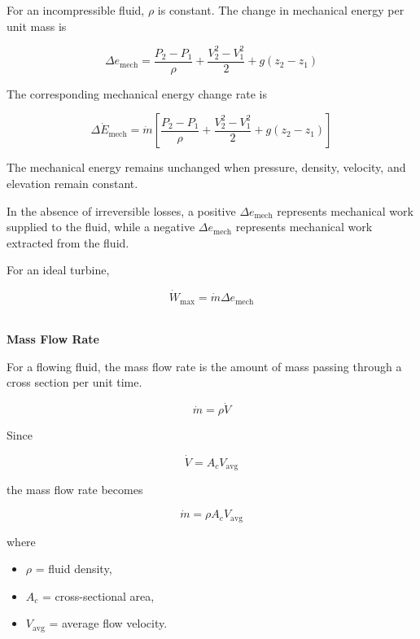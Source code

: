 \documentclass[12pt]{article}
\begin{document}
For an incompressible fluid, $\rho$ is constant. The change in mechanical energy per unit mass is

\begin{equation*}
\Delta e_{\text{mech}}
=
\frac{P_2-P_1}{\rho}
+
\frac{V_2^2-V_1^2}{2}
+
g(z_2-z_1)
\end{equation*}

The corresponding mechanical energy change rate is

\begin{equation*}
\Delta \dot{E}_{\text{mech}}
=
\dot{m}
\left[
\frac{P_2-P_1}{\rho}
+
\frac{V_2^2-V_1^2}{2}
+
g(z_2-z_1)
\right]
\end{equation*}

The mechanical energy remains unchanged when pressure, density, velocity, and elevation remain constant.

In the absence of irreversible losses, a positive $\Delta e_{\text{mech}}$ represents mechanical work supplied to the fluid, while a negative $\Delta e_{\text{mech}}$ represents mechanical work extracted from the fluid.

For an ideal turbine,

\begin{equation*}
\dot{W}_{\max}
=
\dot{m}\Delta e_{\text{mech}}
\end{equation*}

\textbf{\\ Mass Flow Rate}

For a flowing fluid, the mass flow rate is the amount of mass passing through a cross section per unit time.

\begin{equation*}
\dot{m}
=
\rho\dot{V}
\end{equation*}

Since

\begin{equation*}
\dot{V}
=
A_cV_{\text{avg}}
\end{equation*}

the mass flow rate becomes

\begin{equation*}
\dot{m}
=
\rho A_cV_{\text{avg}}
\end{equation*}

where

\begin{itemize}
    \item $\rho$ = fluid density,
    \item $A_c$ = cross-sectional area,
    \item $V_{\text{avg}}$ = average flow velocity.
\end{itemize}
\end{document}
